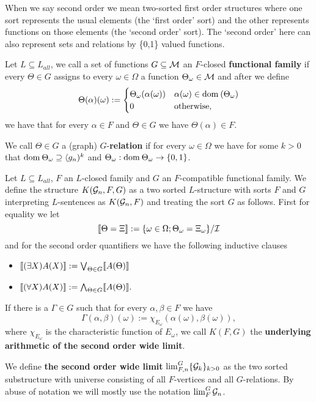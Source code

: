 When we say second order we mean two-sorted first order structures where one sort represents the usual elements (the `first order' sort) and the other represents functions on those elements (the `second order' sort). The `second order' here can also represent sets and relations by \{0,1\} valued functions.

\begin{defi}
Let $L\subseteq L_{all}$, we call a set of functions $G\subseteq \mathcal{M}$ an $F$-closed \textbf{functional family} if every $\Theta\in G$ assigns to every $\omega\in\Omega$ a function $\Theta_\omega\in\mathcal{M}$ and after we define
\[\Theta(\alpha)(\omega):=
\begin{cases}\Theta_\omega(\alpha(\omega))&\alpha(\omega)\in\text{dom}\:(\Theta_\omega)\\0&\text{otherwise,}
\end{cases}\]
we have that for every $\alpha \in F$ and $\Theta \in G$ we have $\Theta(\alpha)\in F$.

We call $\Theta\in G$ a (graph) $G$-\textbf{relation} if for every $\omega\in\Omega$ we have for some $k>0$ that $\text{dom}\: \Theta_\omega \supseteq \langle g_n)^k$ and $\Theta_\omega:\text{dom}\: \Theta_\omega \to \{0,1\}$.
\end{defi}

\begin{defi}
Let $L\subseteq L_{all}$, $F$ an $L$-closed family and $G$ an $F$-compatible functional family. We define the structure $K(\mathcal{G}_n,F,G)$ as a two sorted $L$-structure with sorts $F$ and $G$ interpreting $L$-sentences as $K(\mathcal{G}_n,F)$ and treating the sort $G$ as follows. First for equality we let
\[\llbracket\Theta=\Xi \rrbracket := \{\omega\in \Omega;\Theta_\omega=\Xi_\omega\}/\mathcal{I}\]
and for the second order quantifiers we have the following inductive clauses
\begin{itemize}
\item $\llbracket(\exists X)A(X)\rrbracket:=\bigvee_{\Theta\in G}\llbracket A(\Theta)\rrbracket$
\item $\llbracket(\forall X)A(X)\rrbracket:=\bigwedge_{\Theta\in G}\llbracket A(\Theta)\rrbracket.$
\end{itemize}

If there is a $\Gamma\in G$ such that for every $\alpha,\beta\in F$ we have
\[\Gamma(\alpha,\beta)(\omega):=\chi_{E_\omega}(\alpha(\omega),\beta(\omega)),\]
where $\chi_{E_\omega}$ is the characteristic function of $E_\omega$, we call $K(F,G)$ the \textbf{underlying arithmetic of the second order wide limit}.

We define \textbf{the second order wide limit} $\lim_{F,n}^G\{\mathcal{G}_k\}_{k>0}$ as the two sorted substructure with universe consisting of all $F$-vertices and all $G$-relations. By abuse of notation we will mostly use the notation $\lim_F^G\mathcal{G}_n$.
\end{defi}

